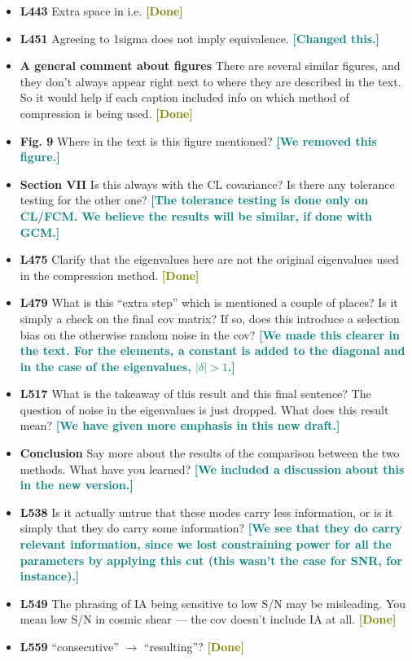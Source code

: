 \documentclass{article}
\newcommand\reply[1]{{\bf {\textcolor{teal}{[#1]}}}}
\newcommand\done{{\bf {\textcolor{olive}{[Done]}}}}
\begin{document}
\begin{itemize}
	\item \textbf{L443} Extra space in i.e. \done
	\item \textbf{L451} Agreeing to 1sigma does not imply equivalence. \reply{Changed this.}
	\item \textbf{A general comment about figures} There are several similar figures, and they don’t always appear right next to where they are described in the text. So it would help if each caption included info on which method of compression is being used. \done
	\item \textbf{Fig. 9} Where in the text is this figure mentioned? \reply{We removed this figure.}
	\item \textbf{Section VII} Is this always with the CL covariance? Is there any tolerance testing for the other one? \reply{The tolerance testing is done only on CL/FCM. We believe the results will be similar, if done with GCM.}
	\item \textbf{L475} Clarify that the eigenvalues here are not the original eigenvalues used in the compression method. \done
	\item \textbf{L479} What is this “extra step” which is mentioned a couple of places? Is it simply a check on the final cov matrix? If so, does this introduce a selection bias on the otherwise random noise in the cov? \reply{We made this clearer in the text. For the elements, a constant is added to the diagonal and in the case of the eigenvalues, $|\delta| > 1$.}
	\item \textbf{L517} What is the takeaway of this result and this final sentence? The question of noise in the eigenvalues is just dropped. What does this result mean? \reply{We have given more emphasis in this new draft.}
	\item \textbf{Conclusion} Say more about the results of the comparison between the two methods. What have you learned? \reply{We included a discussion about this in the new version.}
	\item \textbf{L538} Is it actually untrue that these modes carry less information, or is it simply that they do carry some information? \reply{We see that they do carry relevant information, since we lost constraining power for all the parameters by applying this cut (this wasn't the case for SNR, for instance).}
	\item \textbf{L549} The phrasing of IA being sensitive to low S/N may be misleading. You mean low S/N in cosmic shear — the cov doesn’t include IA at all. \done
	\item \textbf{L559} “consecutive” $\rightarrow$ “resulting”? \done

\end{itemize}
\end{document}
